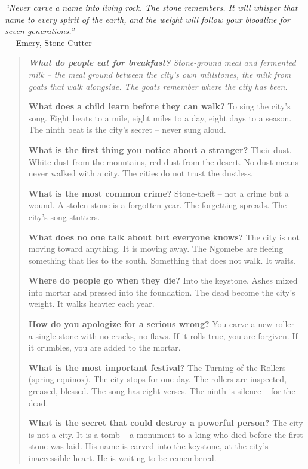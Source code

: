 \documentclass[12pt,oneside]{book}
\newenvironment{almanac}
  {\begin{quote}\small\itshape}
  {\end{quote}}
\begin{document}
\vspace{0.5em}
\noindent\textit{``Never carve a name into living rock. The stone remembers. It will whisper that name to every spirit of the earth, and the weight will follow your bloodline for seven generations.''} \\
--- Emery, Stone-Cutter

\vspace{1em}
\begin{almanac}
\textbf{What do people eat for breakfast?} Stone-ground meal and fermented milk -- the meal ground between the city's own millstones, the milk from goats that walk alongside. The goats remember where the city has been.

\textbf{What does a child learn before they can walk?} To sing the city's song. Eight beats to a mile, eight miles to a day, eight days to a season. The ninth beat is the city's secret -- never sung aloud.

\textbf{What is the first thing you notice about a stranger?} Their dust. White dust from the mountains, red dust from the desert. No dust means never walked with a city. The cities do not trust the dustless.

\textbf{What is the most common crime?} Stone-theft -- not a crime but a wound. A stolen stone is a forgotten year. The forgetting spreads. The city's song stutters.

\textbf{What does no one talk about but everyone knows?} The city is not moving toward anything. It is moving away. The Ngomebe are fleeing something that lies to the south. Something that does not walk. It waits.

\textbf{Where do people go when they die?} Into the keystone. Ashes mixed into mortar and pressed into the foundation. The dead become the city's weight. It walks heavier each year.

\textbf{How do you apologize for a serious wrong?} You carve a new roller -- a single stone with no cracks, no flaws. If it rolls true, you are forgiven. If it crumbles, you are added to the mortar.

\textbf{What is the most important festival?} The Turning of the Rollers (spring equinox). The city stops for one day. The rollers are inspected, greased, blessed. The song has eight verses. The ninth is silence -- for the dead.

\textbf{What is the secret that could destroy a powerful person?} The city is not a city. It is a tomb -- a monument to a king who died before the first stone was laid. His name is carved into the keystone, at the city's inaccessible heart. He is waiting to be remembered.
\end{almanac}
\end{document}
